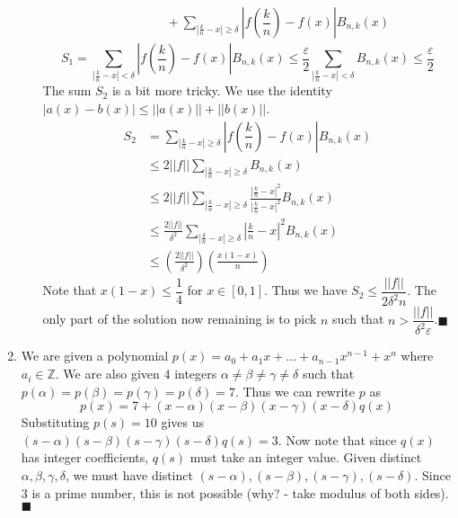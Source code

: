 \documentclass[a4paper, 11pt]{article}
\let\a\alpha
\let\b\beta
\let\g\gamma
\let\e\varepsilon
\newcommand{\Z}{\mathbb{Z}}
\begin{document}
\begin{enumerate}[label=(\arabic*), leftmargin=*]
\begin{enumerate}
\begin{align*}
	&\text{ }\text{ }\text{ }\text{ }\text{ }\text{ }+\sum_{\left|\frac{k}{n}-x\right|\geqslant\delta}\left|f\left(\dfrac{k}{n}\right)-f(x)\right|B_{n,k}(x)
\end{align*}
 $$\displaystyle S_1=\sum_{\left|\frac{k}{n}-x\right|<\delta}\left|f\left(\dfrac{k}{n}\right)-f(x)\right|B_{n,k}(x)\leqslant\frac{\e}{2}\sum_{\left|\frac{k}{n}-x\right|<\delta}B_{n,k}(x)\leqslant\frac{\e}{2}$$  The sum $S_2$ is a bit more tricky. We use the identity $|a(x)-b(x)|\leqslant ||a(x)||+||b(x)||$.
\begin{align*}
	S_2&=\sum_{\left|\frac{k}{n}-x\right|\geqslant\delta}\left|f\left(\dfrac{k}{n}\right)-f(x)\right|B_{n,k}(x)\\
	&\leqslant 2||f||\sum_{\left|\frac{k}{n}-x\right|\geqslant\delta}B_{n,k}(x)\\
	&\leqslant 2||f||\sum_{\left|\frac{k}{n}-x\right|\geqslant\delta}\frac{\left|\frac{k}{n}-x\right|^2}{\left|\frac{k}{n}-x\right|^2}B_{n,k}(x)\\
	&\leqslant \frac{2||f||}{\delta^2}\sum_{\left|\frac{k}{n}-x\right|\geqslant\delta}\left|\frac{k}{n}-x\right|^2 B_{n,k}(x)\\
	&\leqslant\left(\frac{2||f||}{\delta^2}\right)\left(\frac{x(1-x)}{n}\right)
\end{align*}
Note that $x(1-x)\leqslant\dfrac{1}{4}$ for $x\in[0,1]$. Thus we have $S_2\leqslant\dfrac{||f||}{2\delta^2n}$. The only part of the solution now remaining is to pick $n$ such that $n>\dfrac{||f||}{\delta^2\e}$.\hfill$\blacksquare$
	\end{enumerate}
	\item We are given a polynomial $p(x)=a_0+a_1x+\dots+a_{n-1}x^{n-1}+x^n$ where $a_i\in\Z$. We are also given 4 integers $\a\neq\b\neq\g\neq\delta$ such that $p(\a)=p(\b)=p(\g)=p(\delta)=7$. Thus we can rewrite $p$ as
	$$p(x)=7+(x-\a)(x-\b)(x-\g)(x-\delta)q(x)$$
	Substituting $p(s)=10$ gives us $(s-\a)(s-\b)(s-\g)(s-\delta)q(s)=3$. Now note that since $q(x)$ has integer coefficients, $q(s)$ must take an integer value. Given distinct $\a,\b,\g,\delta$, we must have distinct $(s-\a),(s-\b),(s-\g),(s-\delta)$. Since 3 is a prime number, this is not possible (why? - take modulus of both sides).\hfill$\blacksquare$
\end{enumerate}
\end{document}
